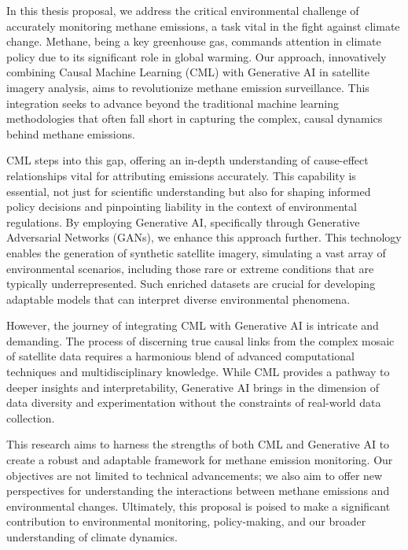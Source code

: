 \cleardoublepage
\label{chap:intro}


In this thesis proposal, we address the critical environmental challenge of accurately monitoring methane emissions, a task vital in the fight against climate change. Methane, being a key greenhouse gas, commands attention in climate policy due to its significant role in global warming. Our approach, innovatively combining Causal Machine Learning (CML) with Generative AI in satellite imagery analysis, aims to revolutionize methane emission surveillance. This integration seeks to advance beyond the traditional machine learning methodologies that often fall short in capturing the complex, causal dynamics behind methane emissions.

CML steps into this gap, offering an in-depth understanding of cause-effect relationships vital for attributing emissions accurately. This capability is essential, not just for scientific understanding but also for shaping informed policy decisions and pinpointing liability in the context of environmental regulations. By employing Generative AI, specifically through Generative Adversarial Networks (GANs), we enhance this approach further. This technology enables the generation of synthetic satellite imagery, simulating a vast array of environmental scenarios, including those rare or extreme conditions that are typically underrepresented. Such enriched datasets are crucial for developing adaptable models that can interpret diverse environmental phenomena.

However, the journey of integrating CML with Generative AI is intricate and demanding. The process of discerning true causal links from the complex mosaic of satellite data requires a harmonious blend of advanced computational techniques and multidisciplinary knowledge. While CML provides a pathway to deeper insights and interpretability, Generative AI brings in the dimension of data diversity and experimentation without the constraints of real-world data collection.

This research aims to harness the strengths of both CML and Generative AI to create a robust and adaptable framework for methane emission monitoring. Our objectives are not limited to technical advancements; we also aim to offer new perspectives for understanding the interactions between methane emissions and environmental changes. Ultimately, this proposal is poised to make a significant contribution to environmental monitoring, policy-making, and our broader understanding of climate dynamics.

